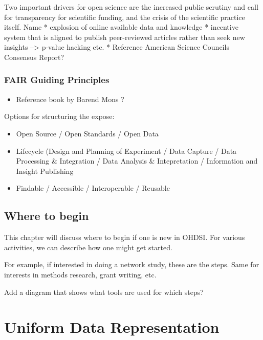 \documentclass[11pt]{book}
\providecommand{\tightlist}{%
  \setlength{\itemsep}{0pt}\setlength{\parskip}{0pt}}
\begin{document}
Two important drivers for open science are the increased public scrutiny
and call for transparency for scientific funding, and the crisis of the
scientific practice itself. Name * explosion of online available data
and knowledge * incentive system that is aligned to publish
peer-reviewed articles rather than seek new insights --\textgreater{}
p-value hacking etc. * Reference American Science Councils Consensus
Report?

\section{FAIR Guiding Principles}\label{fair-guiding-principles}

\begin{itemize}
\tightlist
\item
  Reference book by Barend Mons \citet{barendmons2018}?
\end{itemize}

Options for structuring the expose:

\begin{itemize}
\tightlist
\item
  Open Source / Open Standards / Open Data
\item
  Lifecycle (Design and Planning of Experiment / Data Capture / Data
  Processing \& Integration / Data Analysis \& Intepretation /
  Information and Insight Publishing
\item
  Findable / Accessible / Interoperable / Reusable
\end{itemize}

\chapter{Where to begin}\label{WhereToBegin}

This chapter will discuss where to begin if one is new in OHDSI. For
various activities, we can describe how one might get started.

For example, if interested in doing a network study, these are the
steps. Same for interests in methods research, grant writing, etc.

Add a diagram that shows what tools are used for which steps?

\part{Uniform Data
Representation}\label{part-uniform-data-representation}
\end{document}
